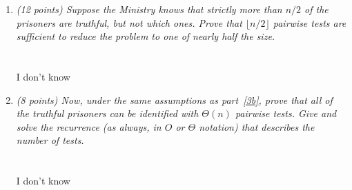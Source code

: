 \documentclass[12pt]{article}
\begin{document}
\begin{enumerate}
\begin{enumerate}
	\item {\itshape \label{3b} (12 points) Suppose the Ministry knows that strictly more than $n/2$ of the prisoners are truthful, but not which ones. Prove that $\lfloor n/2\rfloor$ pairwise tests are sufficient to reduce the problem to one of nearly half the size.}
	\\ \\ \\ I don't know
	\pagebreak
	
	\item {\itshape \label{3c} (8 points) Now, under the same assumptions as part~\eqref{3b}, prove that all of the truthful prisoners can be identified with $\Theta(n)$ pairwise tests. Give and solve the recurrence (as always, in $O$ or $\Theta$ notation) that describes the number of tests.}
	\\ \\ \\ I don't know
	\pagebreak

	\end{enumerate}
	


\end{enumerate}
\end{document}

